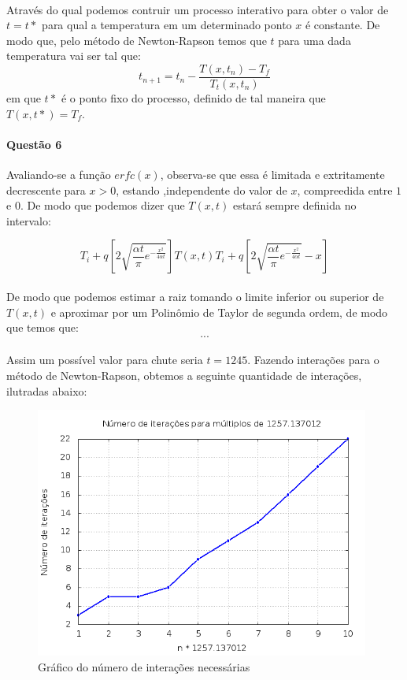 \documentclass[a4paper,11pt]{article}
\begin{document}
\paragraph{}Através do qual podemos contruir um processo interativo para obter o valor de $t = t*$ para qual a temperatura em um determinado ponto $x$ é constante. De modo que, pelo método de Newton-Rapson temos que $t$ para uma dada temperatura vai ser tal que:
\begin{equation}
t_{n+1} = t_{n} - \frac{T(x,t_{n})-T_f}{T_t(x,t_{n})}
\end{equation}
em que $t*$ é o ponto fixo do processo, definido de tal maneira que $T(x,t*) =T_f$.

\paragraph{Questão 6}Avaliando-se a função $erfc(x)$, observa-se que essa é limitada e extritamente decrescente para $x>0$, estando ,independente do valor de $x$, compreedida entre $1$ e $0$. De modo que podemos dizer que $T(x,t)$ estará sempre definida no intervalo:

\begin{equation}
T_i + q\left[2\sqrt{\frac{\alpha t}{\pi}e^{-\frac{x^2}{4\alpha t}}} \right] T(x,t)  T_i + q\left[2\sqrt{\frac{\alpha t}{\pi}e^{-\frac{x^2}{4\alpha t}}} - x\right]
\end{equation}

\paragraph{}De modo que podemos estimar a raiz tomando o limite inferior ou superior de $T(x,t)$ e aproximar por um Polinômio de Taylor de segunda ordem, de modo que temos que:
$$...$$
\paragraph{}Assim um possível valor para chute seria $t=1245$. Fazendo interações para o método de Newton-Rapson, obtemos a seguinte quantidade de interações, ilutradas abaixo:

\begin{figure}[H]
\includegraphics[width=11cm]{../image/questao6.png}
\centering
\caption{Gráfico do número de interações necessárias}
\end{figure}
\end{document}
